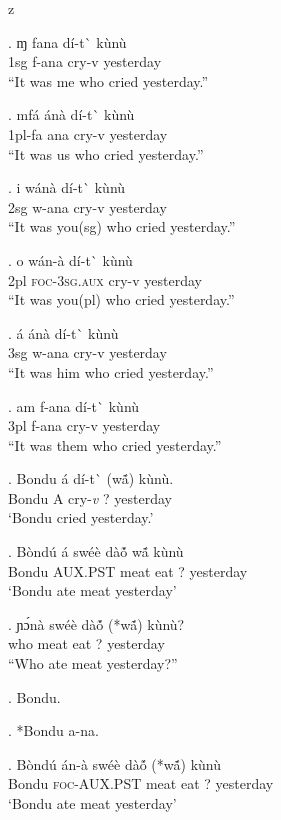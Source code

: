 z   \documentclass{assets/fieldnotes}
\begin{document}
\exg. ɱ fana dí-t\`{} kùnù\\
1sg f-ana cry-v yesterday\\
``It was me who cried yesterday.''

\exg. mfá ánà dí-t\`{} kùnù\\
1pl-fa ana cry-v yesterday\\
``It was us who cried yesterday.''

\exg. i wánà dí-t\`{} kùnù\\
2sg w-ana cry-v yesterday\\
``It was you(sg) who cried yesterday.''

\exg. o wán-à dí-t\`{} kùnù\\
2pl \textsc{foc-3sg.aux} cry-v yesterday\\
``It was you(pl) who cried yesterday.''


\exg. á ánà dí-t\`{} kùnù\\
3sg w-ana cry-v yesterday\\
``It was him who cried yesterday.''

\exg. am f-ana dí-t\`{} kùnù\\
3pl f-ana cry-v yesterday\\
``It was them who cried yesterday.''

\exg. Bondu \'{a} d\'{i}-t\`{} (wã́) k\`{u}n\`{u}. \\
Bondu A cry-\textit{v} ? yesterday \\
`Bondu cried yesterday.'


\exg. Bòndú á swéè dàó̃ wã́ kùnù\\
Bondu AUX.PST meat eat ? yesterday \\%
    `Bondu ate meat yesterday'

\exg. ɲɔ́nà swéè dàó̃ (*wã́) kùnù?\\
who meat eat ? yesterday\\
``Who ate meat yesterday?''

\ex. Bondu.

\ex. *Bondu a-na.

\exg. Bòndú án-à swéè dàó̃ (*wã́) kùnù\\
Bondu \textsc{foc-AUX.PST} meat eat ? yesterday \\%
    `Bondu ate meat yesterday'\\
    
\end{document}
